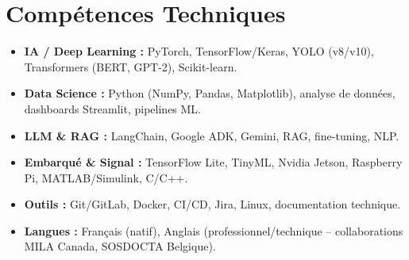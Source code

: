 \documentclass[a4paper,11pt]{article}
\begin{document}
\section{Compétences Techniques}
\begin{itemize}[leftmargin=*, nosep]
    \item \small{\textbf{IA / Deep Learning :} PyTorch, TensorFlow/Keras, YOLO (v8/v10), Transformers (BERT, GPT-2), Scikit-learn.}
    \item \small{\textbf{Data Science :} Python (NumPy, Pandas, Matplotlib), analyse de données, dashboards Streamlit, pipelines ML.}
    \item \small{\textbf{LLM \& RAG :} LangChain, Google ADK, Gemini, RAG, fine-tuning, NLP.}
    \item \small{\textbf{Embarqué \& Signal :} TensorFlow Lite, TinyML, Nvidia Jetson, Raspberry Pi, MATLAB/Simulink, C/C++.}
    \item \small{\textbf{Outils :} Git/GitLab, Docker, CI/CD, Jira, Linux, documentation technique.}
    \item \small{\textbf{Langues :} Français (natif), Anglais (professionnel/technique -- collaborations MILA Canada, SOSDOCTA Belgique).}
\end{itemize}

\end{document}
